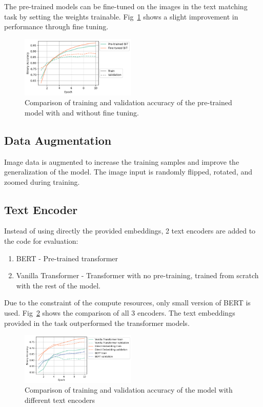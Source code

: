 \documentclass[conference]{IEEEtran}
\begin{document}
The pre-trained models can be fine-tuned on the images in the text matching task by setting the weights trainable. Fig~\ref{fig:trainable_comparison} shows a slight improvement in performance through fine tuning.

\begin{figure}
    \centering
    \includegraphics[width=0.49\textwidth]{trainable_comparison.png}
    \caption{Comparison of training and validation accuracy of the pre-trained model with and without fine tuning.}
    \label{fig:trainable_comparison}
\end{figure}

\subsection{Data Augmentation}

Image data is augmented to increase the training samples and improve the generalization of the model. The image input is randomly flipped, rotated, and zoomed during training.

\subsection{Text Encoder}

Instead of using directly the provided embeddings, 2 text encoders are added to the code for evaluation:

\begin{enumerate}
    \item BERT - Pre-trained transformer
    \item Vanilla Transformer - Transformer with no pre-training, trained from scratch with the rest of the model.
\end{enumerate}

Due to the constraint of the compute resources, only small version of BERT is used. Fig~\ref{fig:text_encoder_comparison} shows the comparison of all 3 encoders. The text embeddings provided in the task outperformed the transformer models.

\begin{figure}
    \centering
    \includegraphics[width=0.49\textwidth]{text_encoder_comparison.png}
    \caption{Comparison of training and validation accuracy of the model with different text encoders}
    \label{fig:text_encoder_comparison}
\end{figure}
\end{document}

